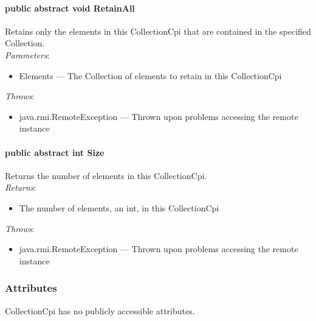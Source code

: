 \documentclass[$Date: 2003/06/26 19:29:31 $]{glabarticle}
\begin{document}
\paragraph{public abstract void RetainAll}

Retains only the elements in this CollectionCpi that are contained in the
specified Collection.\\

\textit{Parameters}:
\begin{itemize}
\item[] Elements --- The Collection of elements to retain in this CollectionCpi 
\end{itemize}

 \textit{Throws}:
 \begin{itemize}
 \item[] java.rmi.RemoteException --- Thrown upon problems accessing the remote instance 
 \end{itemize}

\paragraph{public abstract int Size}

Returns the number of elements in this CollectionCpi.\\

\textit{Returns}:
\begin{itemize}
\item[] The number of elements, an int, in this CollectionCpi
\end{itemize}

 \textit{Throws}:
 \begin{itemize}
 \item[] java.rmi.RemoteException --- Thrown upon problems accessing the remote instance 
 \end{itemize}


\subsubsection{Attributes}

CollectionCpi has no publicly accessible attributes.

\end{document}
